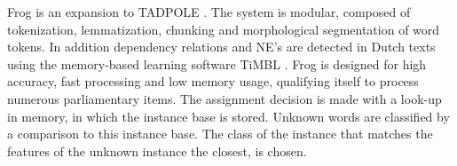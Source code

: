 Frog is an expansion to TADPOLE \cite{bosch2007efficient}. The system is modular, composed of tokenization, lemmatization, chunking and morphological segmentation of word tokens. In addition dependency relations and NE's are detected in Dutch texts using the memory-based learning software TiMBL \cite{daelemans2004timbl}. Frog is designed for high accuracy, fast processing and low memory usage, qualifying itself to process numerous parliamentary items. The assignment decision is made with a look-up in memory, in which the instance base is stored. Unknown words are classified by a comparison to this instance base. The class of the instance that matches the features of the unknown instance the closest, is chosen.  




